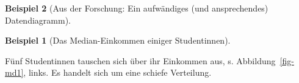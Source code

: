 \documentclass[
  a4paper,
]{scrbook}
\theoremstyle{definition}
\newtheorem{example}{Beispiel}[chapter]
\theoremstyle{definition}
\theoremstyle{definition}
\theoremstyle{remark}
\begin{document}
\begin{example}[Aus der Forschung: Ein aufwändiges (und ansprechendes)
Datendiagramm]
\begin{tcolorbox}
\end{tcolorbox}

\begin{example}[Das Median-Einkommen einiger
Studentinnen]\protect\hypertarget{exm-med}{}\label{exm-med}

Fünf Studentinnen tauschen sich über ihr Einkommen aus, s.
Abbildung~\ref{fig-md1}, links. Es handelt sich um eine schiefe
Verteilung.

\begin{figure}

\begin{minipage}{\linewidth}



\end{minipage}%
\newline
\begin{minipage}{\linewidth}

\end{minipage}
\end{figure}
\end{example}
\end{example}
\end{document}
